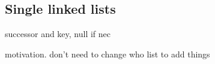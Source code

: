 
\subsection{Single linked lists}

successor and key, null if nec

motivation. don't need to change who list to add things

